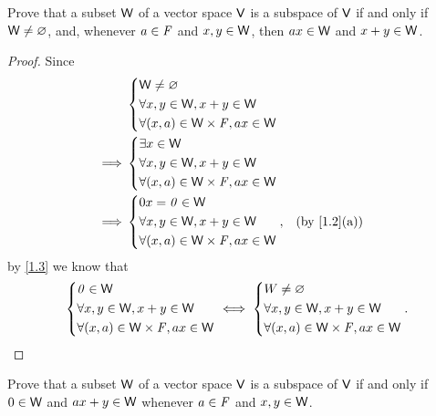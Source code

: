 \begin{ex}\label{ex:1.3.17}
  Prove that a subset \(\mathsf{W}\) of a vector space \(\mathsf{V}\) is a subspace of \(\mathsf{V}\) if and only if \(\mathsf{W} \neq \varnothing\), and, whenever \(a \in \mathit{F}\) and \(x, y \in \mathsf{W}\), then \(ax \in \mathsf{W}\) and \(x + y \in \mathsf{W}\).
\end{ex}

\begin{proof}
  Since
  \begin{align*}
             & \begin{dcases}
      \W \neq \varnothing               \\
      \forall x, y \in \W, x + y \in \W \\
      \forall (x, a) \in \W \times \F, ax \in \W
    \end{dcases}                                 \\
    \implies & \begin{dcases}
      \exists x \in \W                  \\
      \forall x, y \in \W, x + y \in \W \\
      \forall (x, a) \in \W \times \F, ax \in \W
    \end{dcases}                                 \\
    \implies & \begin{dcases}
      0x = \zv \in \W                   \\
      \forall x, y \in \W, x + y \in \W \\
      \forall (x, a) \in \W \times \F, ax \in \W
    \end{dcases}, &  & \text{(by \cref{1.2}(a))}
  \end{align*}
  by \cref{1.3} we know that
  \[
    \begin{dcases}
      \mathit{0} \in \mathsf{W}                        \\
      \forall x, y \in \mathsf{W}, x + y \in \mathsf{W} \\
      \forall (x, a) \in \mathsf{W} \times \mathit{F}, ax \in \mathsf{W}
    \end{dcases} \iff \begin{dcases}
      W \neq \varnothing                \\
      \forall x, y \in \mathsf{W}, x + y \in \mathsf{W} \\
      \forall (x, a) \in \mathsf{W} \times \mathit{F}, ax \in \mathsf{W}
    \end{dcases}.
  \]
\end{proof}

\begin{ex}\label{ex:1.3.18}
  Prove that a subset \(\mathsf{W}\) of a vector space \(\mathsf{V}\) is a subspace of \(\mathsf{V}\) if and only if \(0 \in \mathsf{W}\) and \(ax + y \in \mathsf{W}\) whenever \(a \in \mathit{F}\) and \(x, y \in \mathsf{W}\).
\end{ex}


